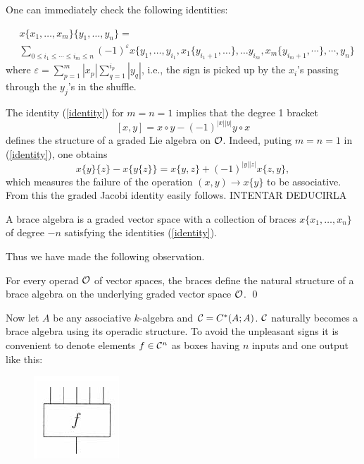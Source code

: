 \documentclass[TFM.tex]{subfiles}
\begin{document}
One can immediately check the following identities:

\begin{equation}\label{identity}
\begin{aligned}
&x\{x_1, \dots , x_m\}\{y_1, \dots , y_n\}=\\
&\sum_{0\leq i_1\leq\cdots\leq i_m\leq n}(-1)^\varepsilon x\{y_1,\dots, y_{i_1}, x_1\{y_{i_1+1},\dots\},\dots y_{i_m}, x_m\{y_{i_m+1},\cdots\},\cdots, y_n\}
\end{aligned}
\end{equation}
where $\varepsilon =\sum^m_{p=1}|x_p|\sum^{i_p}_{q=1}|y_q|$, i.e., the sign is picked up by the $x_i$’s passing through the
$y_j$’s in the shuffle.


\begin{remark}
The identity (\ref{identity}) for $m=n=1$ implies that the degree 1 bracket
\[
[x,y]=x\circ y-(-1)^{|x||y|}y\circ x
\]
defines the structure of a graded Lie algebra on ${\mathcal O}$. Indeed, puting $m = n = 1$ in (\ref{identity}), one obtains 
$$x\{y\}\{z\} − x\{y\{z\}\} = x\{y, z\} + (−1)^{|y||z|}x\{z, y\},$$
which measures the failure of the operation $(x, y) → x\{y\}$ to be associative. From this the
graded Jacobi identity easily follows. INTENTAR DEDUCIRLA
\end{remark}

\begin{defi}
A brace algebra is a graded vector space with a collection of braces
$x\{x_1,\dots , x_n\}$ of degree $−n$ satisfying the identities (\ref{identity}).
\end{defi}

Thus we have made the following observation.

\begin{prop}
For every operad ${\mathcal O}$ of vector spaces, the braces define the natural
structure of a brace algebra on the underlying graded vector space ${\mathcal O}$. \qed
\end{prop}

Now let $A$ be any associative $k$-algebra and $\mathcal{C}=C^*(A;A)$. $\mathcal{C}$ naturally becomes a brace algebra using its operadic structure. To avoid the unpleasant signs it is convenient to denote elements $f \in \mathcal{C}^n$ as boxes having $n$ inputs and one output like this:

\begin{figure}[h!]
\includegraphics[scale=0.8]{Imagenes//box}
\end{figure}
\end{document}
